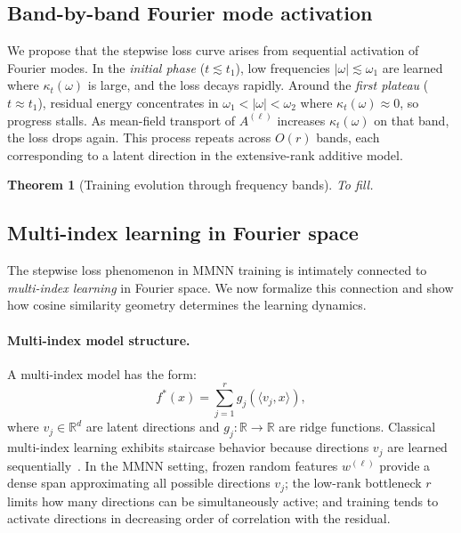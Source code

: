 \documentclass{article}
\newtheorem{theorem}{Theorem}
\begin{document}
\vspace{1em}
\subsection{Band-by-band Fourier mode activation}
We propose that the stepwise loss curve arises from sequential activation of Fourier modes. In the \emph{initial phase} (\( t \lesssim t_1 \)), low frequencies \( |\omega| \lesssim \omega_1 \) are learned where \( \kappa_t(\omega) \) is large, and the loss decays rapidly. Around the \emph{first plateau} (\( t \approx t_1 \)), residual energy concentrates in \( \omega_1<|\omega|<\omega_2 \) where \( \kappa_t(\omega)\approx 0 \), so progress stalls. As mean-field transport of \( A^{(\ell)} \) increases \( \kappa_t(\omega) \) on that band, the loss drops again. This process repeats across \( O(r) \) bands, each corresponding to a latent direction in the extensive-rank additive model.

\begin{theorem}[Training evolution through frequency bands]
\label{thm:frequency_evolution}
To fill.
\end{theorem}

\vspace{1em}
\subsection{Multi-index learning in Fourier space}

The stepwise loss phenomenon in MMNN training is intimately connected to \emph{multi-index learning} in Fourier space. We now formalize this connection and show how cosine similarity geometry determines the learning dynamics.

\paragraph{Multi-index model structure.}
A multi-index model has the form:
\[
f^*(x) = \sum_{j=1}^r g_j(\langle v_j, x \rangle),
\]
where \( v_j \in \mathbb{R}^d \) are latent directions and \( g_j : \mathbb{R} \to \mathbb{R} \) are ridge functions. Classical multi-index learning exhibits staircase behavior because directions \( v_j \) are learned sequentially~\cite{benarous2021online}. In the MMNN setting, frozen random features \( w^{(\ell)} \) provide a dense span approximating all possible directions \( v_j \); the low-rank bottleneck \( r \) limits how many directions can be simultaneously active; and training tends to activate directions in decreasing order of correlation with the residual.
\end{document}
